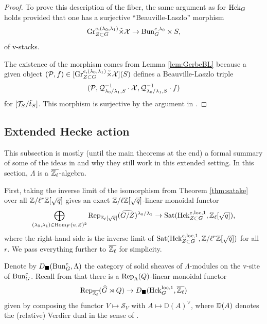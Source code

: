 \begin{proof}
To prove this description of the fiber, the same argument as for $\mathrm{Hck}_{G}$ holds provided that one has a surjective ``Beauville-Laszlo'' morphism
\begin{equation*}
    \textnormal{Gr}_{Z \subset G}^{e,(\lambda_{0},\lambda_{1})} \tilde{\times} \mathcal{X} \to \mathrm{Bun}_{G}^{e,\lambda_{0}} \times S,
\end{equation*}
of v-stacks. 

The existence of the morphism comes from Lemma \ref{lem:GerbeBL} because a given object $(\mathcal{P},f) \in [\textnormal{Gr}_{Z \subset G}^{e,(\lambda_{0},\lambda_{1})} \tilde{\times} \mathcal{X}](S)$ defines a Beauville-Laszlo triple
\begin{equation*}
(\mathcal{P}, \mathcal{Q}_{\lambda_{0}/\lambda_{1},S}^{-1} \cdot\mathcal{X},\mathcal{Q}_{\lambda_{0}/\lambda_{1},S}^{-1}\cdot f)
\end{equation*}
for $[\mathcal{T}_{S}/\tilde{t}_{S}]$.
This morphism is surjective by the argument in \cite[Proposition III.3.1]{Geometrization}.
\end{proof}

\subsection{Extended Hecke action}\label{sec:Extended-Hecke-Action}
This subsection is mostly (until the main theorems at the end) a formal summary of some of the ideas in \cite[\S IX]{Geometrization} and why they still work in this extended setting. In this section, $\Lambda$ is a $\overline{\mathbb{Z}_{\ell}}$-algebra.

First, taking the inverse limit of the isomorphism from Theorem \ref{thm:satake} over all $\mathbb{Z}/\ell^{r}\mathbb{Z}[\sqrt{q}]$ gives an exact $\mathbb{Z}/\ell\mathbb{Z}[\sqrt{q}]$-linear monoidal functor
\begin{equation*}
    \bigoplus_{(\lambda_{0}, \lambda_{1}) \in \mathrm{Hom}_{F}(u, Z)^{2}} \textnormal{Rep}_{\mathbb{Z}_{\ell}[\sqrt{q}]}(\widehat{G/Z})^{\lambda_{0}/\lambda_{1}} \to \textnormal{Sat}(\mathrm{Hck}_{Z \subset G}^{e,\mathrm{loc},1}, \mathbb{Z}_{\ell}[\sqrt{q}]),
\end{equation*}
where the right-hand side is the inverse limit of $\textnormal{Sat}(\mathrm{Hck}_{Z \subset G}^{e,\mathrm{loc},1}, \mathbb{Z}/\ell^{r}\mathbb{Z}[\sqrt{q}])$ for all $r$. We pass everything further to $\overline{\mathbb{Z}_{\ell}}$ for simplicity.

Denote by $D_{\blacksquare}(\mathrm{Bun}_{G}^{e},\Lambda)$ the category of solid sheaves of $\Lambda$-modules on the v-site of $\mathrm{Bun}_{G}^{e}$. Recall from \cite[\S IX.2]{Geometrization} that there is a $\textnormal{Rep}_{\Lambda}(Q)$-linear monoidal functor
\begin{equation*}
\textnormal{Rep}_{\overline{\mathbb{Z}_{\ell}}}(\widehat{G} \rtimes Q) \to D_{\blacksquare}(\mathrm{Hck}_{G}^{\mathrm{loc},1}, \overline{\mathbb{Z}_{\ell}})
\end{equation*}
given by composing the functor $V \mapsto \mathcal{S}_{V}$ with $A \mapsto \mathbb{D}(A)^{\vee}$, where $\mathbb D(A)$ denotes the (relative) Verdier dual in the sense of \cite[\S V.6]{Geometrization}.

